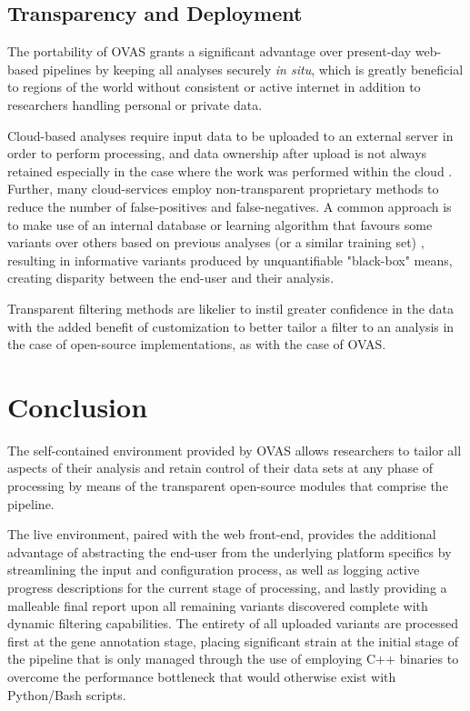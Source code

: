 \documentclass{bioinfo}
\def\app{OVAS}
\begin{document}
\subsection{Transparency and Deployment}

The portability of \app{} grants a significant advantage over present-day web-based pipelines by keeping all analyses securely \textit{in situ}, which is greatly beneficial to regions of the world without consistent or active internet in addition to researchers handling personal or private data.

Cloud-based analyses require input data to be uploaded to an external server in order to perform processing, and data ownership after upload is not always retained especially in the case where the work was performed within the cloud \citep{reed2010information}. Further, many cloud-services employ non-transparent proprietary methods to reduce the number of false-positives and false-negatives. A common approach is to make use of an internal database or learning algorithm that favours some variants over others based on previous analyses (or a similar training set) \citep{pabinger2014survey}, resulting in informative variants produced by unquantifiable "black-box" means, creating disparity between the end-user and their analysis.

Transparent filtering methods are likelier to instil greater confidence in the data with the added benefit of customization to better tailor a filter to an analysis in the case of open-source implementations, as with the case of \app{}.



\section{Conclusion}

The self-contained environment provided by \app{} allows researchers to tailor all aspects of their analysis and retain control of their data sets at any phase of processing by means of the transparent open-source modules that comprise the pipeline. 

The live environment, paired with the web front-end, provides the additional advantage of abstracting the end-user from the underlying platform specifics by streamlining the input and configuration process, as well as logging active progress descriptions for the current stage of processing, and lastly providing a malleable final report upon all remaining variants discovered complete with dynamic filtering capabilities. The entirety of all uploaded variants are processed first at the gene annotation stage, placing significant strain at the initial stage of the pipeline that is only managed through the use of employing C++ binaries to overcome the performance bottleneck that would otherwise exist with Python/Bash scripts.
\end{document}
